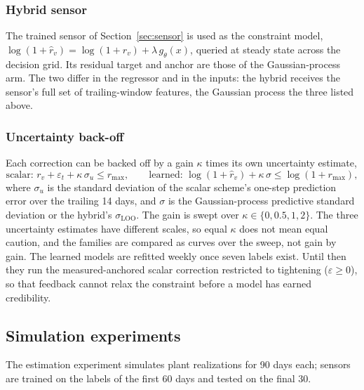 \subsubsection{Hybrid sensor}\label{sec:hybridarm}

The trained sensor of Section~\ref{sec:sensor} is used as the
constraint model, $\log(1+\hat r_v) = \log(1+r_v) + \lambda\,
g_\theta(x)$, queried at steady state across the decision grid. Its
residual target and anchor are those of the Gaussian-process arm. The
two differ in the regressor and in the inputs: the hybrid receives the
sensor's full set of trailing-window features, the Gaussian process the
three listed above.

\subsubsection{Uncertainty back-off}\label{sec:backoff}

Each correction can be backed off by a gain $\kappa$ times its own
uncertainty estimate,
\begin{equation}\label{eq:backoff}
\text{scalar: } r_v + \varepsilon_t + \kappa\,\sigma_u \le r_{\max},
\qquad
\text{learned: } \log(1+\hat r_v) + \kappa\,\sigma \le \log(1+r_{\max}),
\end{equation}
where $\sigma_u$ is the standard deviation of the scalar scheme's
one-step prediction error over the trailing 14 days, and $\sigma$ is the
Gaussian-process predictive standard deviation or the hybrid's
$\sigma_{\mathrm{LOO}}$. The gain is swept over
$\kappa \in \{0, 0.5, 1, 2\}$. The three uncertainty estimates have
different scales, so equal $\kappa$ does not mean equal caution, and the
families are compared as curves over the sweep, not gain by gain. The
learned models are refitted weekly once seven labels exist. Until then
they run the measured-anchored scalar correction restricted to
tightening ($\varepsilon \ge 0$), so that feedback cannot relax the
constraint before a model has earned credibility.

\subsection{Simulation experiments}\label{sec:design}

The estimation experiment simulates  plant realizations
for 90 days each; sensors are trained on the labels of the first 60
days and tested on the final 30.

